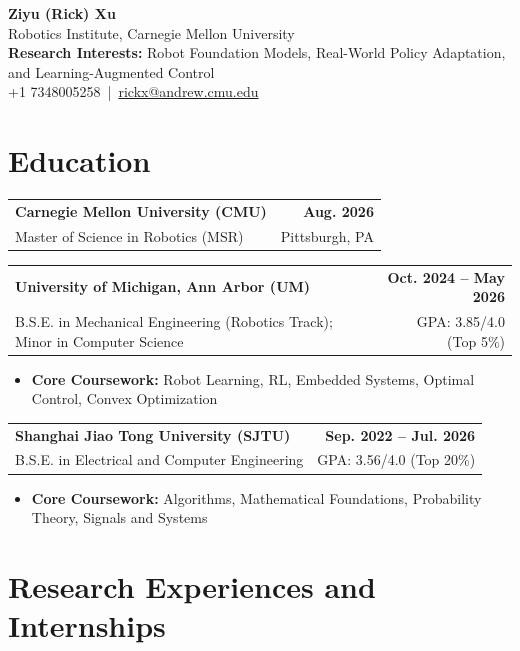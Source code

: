 \documentclass[11pt,letterpaper]{article}
\makeatletter
\newcommand{\resumeSubheading}[4]{
    \begin{tabularx}{\textwidth}{@{}Xr@{}}
        \textbf{#1} & \textbf{#2} \\
        #3 & #4 \\
    \end{tabularx}
}
\makeatother
\begin{document}
\begin{center}
    {\LARGE \textbf{Ziyu (Rick) Xu}} \\[2pt]
    {\small Robotics Institute, Carnegie Mellon University} \\[1pt]
    {\small \textbf{Research Interests:} Robot Foundation Models, Real-World Policy Adaptation, and Learning-Augmented Control} \\[1pt]
    {\small
    +1 7348005258
    \,|\, 
    \href{mailto:rickx@andrew.cmu.edu}{rickx@andrew.cmu.edu}
    } \\[1pt]
\end{center}

\section*{Education}

\resumeSubheading
{Carnegie Mellon University (CMU)}
{Aug. 2026}
{\hspace*{1.4em}Master of Science in Robotics (MSR)}
{Pittsburgh, PA}
\resumeSubheading
{University of Michigan, Ann Arbor (UM)}
{Oct. 2024 -- May 2026}
{\hspace*{1.4em}B.S.E. in Mechanical Engineering (Robotics Track); Minor in Computer Science}
{GPA: 3.85/4.0 (Top 5\%)}
\begin{itemize}[leftmargin=2.4em, itemsep=0.5pt, topsep=0pt]
    \item \textbf{Core Coursework:} Robot Learning, RL, Embedded Systems, Optimal Control, Convex Optimization
\end{itemize}

\resumeSubheading
{Shanghai Jiao Tong University (SJTU)}
{Sep. 2022 -- Jul. 2026}
{\hspace*{1.4em}B.S.E. in Electrical and Computer Engineering}
{GPA: 3.56/4.0 (Top 20\%)}
\begin{itemize}[leftmargin=2.4em, itemsep=0.5pt, topsep=0pt]
    \item \textbf{Core Coursework:} Algorithms, Mathematical Foundations, Probability Theory, Signals and Systems
\end{itemize}
\section*{Research Experiences and Internships}
\end{document}
